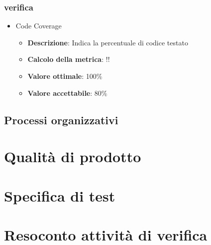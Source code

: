 \documentclass[12pt]{article}
\begin{document}
\subsubsection{verifica}
\begin{itemize}
	\item Code Coverage
	\begin{itemize}
		\item \textbf{Descrizione}: Indica la percentuale di codice testato
		\item \textbf{Calcolo della metrica}:  !!
		\item \textbf{Valore ottimale}: 100\%
		\item \textbf{Valore accettabile}: 80\%
	\end{itemize}
\end{itemize}

\subsection{Processi organizzativi}

\section{Qualità di prodotto}
\section{Specifica di test}
\section {Resoconto attività di verifica}
\end{document}
